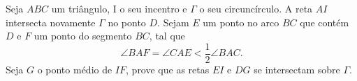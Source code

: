 Seja $ABC$ um triângulo, I o seu incentro e $\Gamma$ o seu circuncírculo. A reta $AI$ intersecta novamente $\Gamma$ no ponto $D$. Sejam $E$ um ponto no arco $BC$ que contém $D$ e $F$ um ponto do segmento $BC$, tal que \[\angle BAF=\angle CAE < \frac{1}{2} \angle BAC.\]
Seja $G$ o ponto médio de $IF$,  prove que as retas $EI$ e $DG$ se intersectam sobre $\Gamma$.
